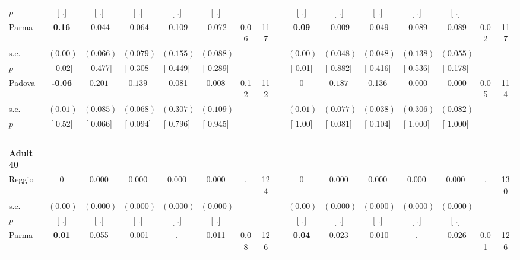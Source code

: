\begin{longtable}{L{8em} c c c c c c c p{1em} c c c c c c c}
\quad \quad \quad \quad $ p$ & [        .] & [        .] & [        .] & [        .] & [        .] & & & & [        .] & [        .] & [        .] & [        .] & [        .] & &  \\[1em]
\quad \quad \quad Parma& \textbf{     0.16} &    -0.044 &    -0.064 &    -0.109 &    -0.072 &      0.06 &       117 & & \textbf{     0.09} &    -0.009 &    -0.049 &    -0.089 &    -0.089 &      0.02 &       117  \\*
\quad \quad \quad \quad s.e.& $ (     0.00)$ & $ (    0.066)$ & $ (    0.079)$ & $ (    0.155)$ & $ (    0.088)$ & & & & $ (     0.00)$ & $ (    0.048)$ & $ (    0.048)$ & $ (    0.138)$ & $ (    0.055)$ & &  \\*
\quad \quad \quad \quad $ p$ & [     0.02] & [    0.477] & [    0.308] & [    0.449] & [    0.289] & & & & [     0.01] & [    0.882] & [    0.416] & [    0.536] & [    0.178] & &  \\[1em]
\quad \quad \quad Padova& \textbf{    -0.06} & $ \mathbf{    0.201}$ & $ \mathbf{    0.139}$ &    -0.081 &     0.008 &      0.12 &       112 & & 0 & $ \mathbf{    0.187}$ &     0.136 &    -0.000 &    -0.000 &      0.05 &       114  \\*
\quad \quad \quad \quad s.e.& $ (     0.01)$ & $ (    0.085)$ & $ (    0.068)$ & $ (    0.307)$ & $ (    0.109)$ & & & & $ (     0.01)$ & $ (    0.077)$ & $ (    0.038)$ & $ (    0.306)$ & $ (    0.082)$ & &  \\*
\quad \quad \quad \quad $ p$ & [     0.52] & [    0.066] & [    0.094] & [    0.796] & [    0.945] & & & & [     1.00] & [    0.081] & [    0.104] & [    1.000] & [    1.000] & &  \\[1em]
~\\[1em]
\quad \quad \textbf{Adult 40} & & & & & & & & & & & & & & & \\* 
\quad \quad \quad Reggio& 0 &     0.000 &     0.000 &     0.000 &     0.000 &         . &       124 & & 0 &     0.000 &     0.000 &     0.000 &     0.000 &         . &       130  \\*
\quad \quad \quad \quad s.e.& $ (     0.00)$ & $ (    0.000)$ & $ (    0.000)$ & $ (    0.000)$ & $ (    0.000)$ & & & & $ (     0.00)$ & $ (    0.000)$ & $ (    0.000)$ & $ (    0.000)$ & $ (    0.000)$ & &  \\*
\quad \quad \quad \quad $ p$ & [        .] & [        .] & [        .] & [        .] & [        .] & & & & [        .] & [        .] & [        .] & [        .] & [        .] & &  \\[1em]
\quad \quad \quad Parma& \textbf{     0.01} &     0.055 &    -0.001 &         . &     0.011 &      0.08 &       126 & & \textbf{     0.04} &     0.023 &    -0.010 &         . &    -0.026 &      0.01 &       126  \\*

\end{longtable}
